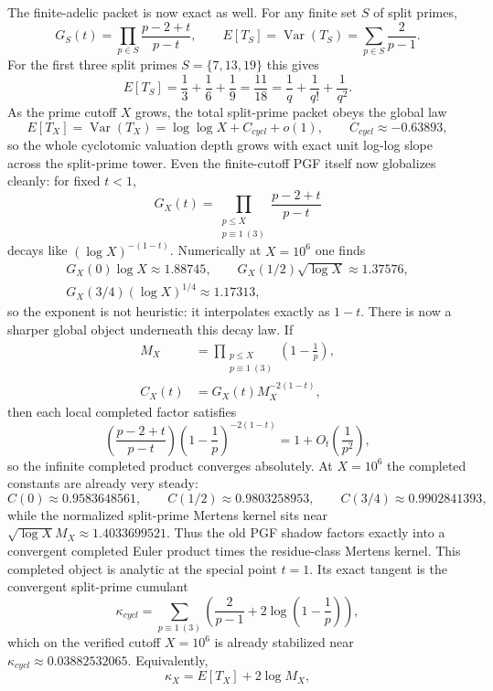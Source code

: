 \documentclass[12pt,a4paper]{article}
\def\mathbb#1{#1}%
\def\mathrm#1{#1}%
\def\mathcal#1{#1}%
\theoremstyle{definition}
\begin{document}
The finite-adelic packet is now exact as well. For any finite set $S$ of split primes,
\[
G_S(t)=\prod_{p\in S}\frac{p-2+t}{p-t},
\qquad
\mathbb E[T_S]=\operatorname{Var}(T_S)=\sum_{p\in S}\frac{2}{p-1}.
\]
For the first three split primes $S=\{7,13,19\}$ this gives
\[
\mathbb E[T_S]=\frac13+\frac16+\frac19=\frac{11}{18}=\frac1q+\frac1{q!}+\frac1{q^2}.
\]
As the prime cutoff $X$ grows, the total split-prime packet obeys the global law
\[
\mathbb E[T_X]=\operatorname{Var}(T_X)=\log\log X + C_{\mathrm{cycl}} + o(1),
\qquad C_{\mathrm{cycl}}\approx -0.63893,
\]
so the whole cyclotomic valuation depth grows with exact unit log-log slope across the split-prime tower.
Even the finite-cutoff PGF itself now globalizes cleanly: for fixed $t<1$,
\[
G_X(t)=\prod_{\substack{p\le X\\ p\equiv1\ (3)}}\frac{p-2+t}{p-t}
\]
decays like $(\log X)^{-(1-t)}$. Numerically at $X=10^6$ one finds
\[
\begin{gathered}
G_X(0)\log X\approx1.88745,\qquad
G_X(1/2)\sqrt{\log X}\approx1.37576,\\
G_X(3/4)(\log X)^{1/4}\approx1.17313,
\end{gathered}
\]
so the exponent is not heuristic: it interpolates exactly as $1-t$.
There is now a sharper global object underneath this decay law. If
\[
\begin{aligned}
M_X&=\prod_{\substack{p\le X\\ p\equiv1\ (3)}}\left(1-\frac1p\right), \\
\mathcal C_X(t)&=G_X(t)M_X^{-2(1-t)},
\end{aligned}
\]
then each local completed factor satisfies
\[
\left(\frac{p-2+t}{p-t}\right)\left(1-\frac1p\right)^{-2(1-t)}=1+O_t\!\left(\frac1{p^2}\right),
\]
so the infinite completed product converges absolutely. At $X=10^6$ the completed constants are already very steady:
\[
\mathcal C(0)\approx0.9583648561,\qquad \mathcal C(1/2)\approx0.9803258953,\qquad \mathcal C(3/4)\approx0.9902841393,
\]
while the normalized split-prime Mertens kernel sits near $\sqrt{\log X}M_X\approx1.4033699521$. Thus the old PGF shadow factors exactly into a convergent completed Euler product times the residue-class Mertens kernel.
This completed object is analytic at the special point $t=1$. Its exact tangent is the convergent split-prime cumulant
\[
\kappa_{\mathrm{cycl}}=\sum_{p\equiv1\ (3)}\left(\frac{2}{p-1}+2\log\left(1-\frac1p\right)\right),
\]
which on the verified cutoff $X=10^6$ is already stabilized near $\kappa_{\mathrm{cycl}}\approx0.03882532065$. Equivalently,
\[
\kappa_X=\mathbb E[T_X]+2\log M_X,
\]
\end{document}
